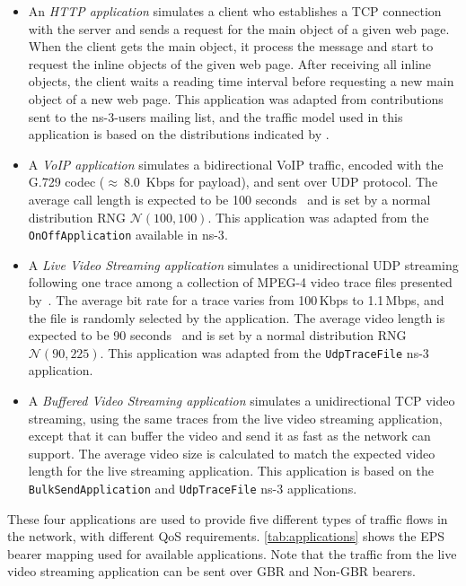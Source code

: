\begin{itemize}
  \item An \emph{\ac{HTTP} application} simulates a client who establishes a
  \ac{TCP} connection with the server and sends a request for the main object
  of a given web page. When the client gets the main object, it process the
  message and start to request the inline objects of the given web page. After
  receiving all inline objects, the client waits a reading time interval before
  requesting a new main object of a new web page. This application was adapted
  from contributions sent to the ns-3-users mailing list, and the traffic model
  used in this application is based on the distributions indicated by
  \citet{Pries2012}.

  \item A \emph{\ac{VoIP} application} simulates a bidirectional \ac{VoIP}
  traffic, encoded with the G.729 codec ($\approx~8.0$~Kbps for payload), and
  sent over \ac{UDP} protocol. The average call length is expected to be 100
  seconds~\cite{Guo2007, Melo2010} and is set by a normal distribution \ac{RNG}
  $\mathcal{N}(100,100)$. This application was adapted from the
  \texttt{OnOffApplication} available in \ac{ns-3}.

  \item A \emph{Live Video Streaming application} simulates a unidirectional
  \ac{UDP} streaming following one trace among a collection of \acs{MPEG}-4
  video trace files presented by~\citet{Fitzek2001}. The average bit rate for a
  trace varies from 100\,Kbps to 1.1\,Mbps, and the file is randomly selected
  by the application. The average video length is expected to be 90
  seconds~\cite{youtubeStats} and is set by a normal distribution \ac{RNG}
  $\mathcal{N}(90,225)$. This application was adapted from the
  \texttt{UdpTraceFile} \ac{ns-3} application.

  \item A \emph{Buffered Video Streaming application} simulates a
  unidirectional \ac{TCP} video streaming, using the same traces from the live
  video streaming application, except that it can buffer the video and send it
  as fast as the network can support. The average video size is calculated to
  match the expected video length for the live streaming application. This
  application is based on the \texttt{BulkSendApplication} and
  \texttt{UdpTraceFile} \ac{ns-3} applications.
\end{itemize}

These four applications are used to provide five different types of traffic
flows in the network, with different \ac{QoS} requirements.
\autoref{tab:applications} shows the \ac{EPS} bearer mapping used for available
applications. Note that the traffic from the live video streaming application
can be sent over \ac{GBR} and Non-\ac{GBR} bearers.

